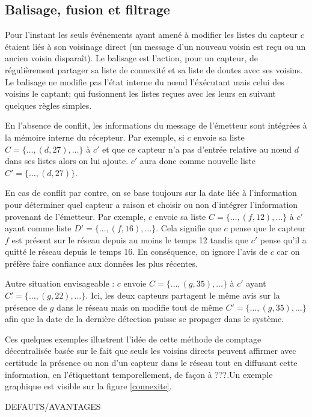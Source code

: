 \documentclass[10pt]{article}
\begin{document}
\begin{multicols}{2}
\subsection*{Balisage, fusion et filtrage}

Pour l'instant les seuls événements ayant amené à modifier les listes
du capteur $c$ étaient liés à son voisinage direct (un message d'un
nouveau voisin est reçu ou un ancien voisin disparaît). Le balisage
est l'action, pour un capteur, de régulièrement partager sa liste de
connexité et sa liste de doutes avec ses voisins. Le balisage ne
modifie pas l'état interne du n\oe ud l'éxécutant mais celui des
voisins le captant; qui fusionnent les listes reçues avec les leurs en
suivant quelques règles simples.

En l'absence de conflit, les informations du message de l'émetteur
sont intégrées à la mémoire interne du récepteur. Par exemple, si $c$
envoie sa liste $C = \{\dots,(d,27),\dots\}$ à $c'$ et que ce
capteur n'a pas d'entrée relative au n\oe ud $d$ dans ses listes alors
on lui ajoute. $c'$ aura donc comme nouvelle liste $C' =
\{\dots,(d,27)\}$.

En cas de conflit par contre, on se base toujours sur la date liée à
l'information pour déterminer quel capteur a raison et choisir ou non
d'intégrer l'information provenant de l'émetteur. Par exemple, $c$
envoie sa liste $C = \{\dots,(f,12),\dots\}$ à $c'$ ayant comme liste
$D' = \{\dots,(f,16),\dots\}$. Cela signifie que $c$ pense que le
capteur $f$ est présent sur le réseau depuis au moins le temps 12
tandis que $c'$ pense qu'il a quitté le réseau depuis le temps 16. En
conséquence, on ignore l'avis de $c$ car on préfère faire confiance
aux données les plus récentes.

Autre situation envisageable : $c$ envoie $C = \{\dots,(g,35),\dots\}$
à $c'$ ayant $C' = \{\dots,(g,22),\dots\}$. Ici, les deux capteurs
partagent le même avis sur la présence de $g$ dans le réseau mais on
modifie tout de même $C' = \{\dots,(g,35),\dots\}$ afin que la date de
la dernière détection puisse se propager dans le système.

Ces quelques exemples illustrent l'idée de cette méthode de comptage
décentralisée basée sur le fait que seuls les voisins directs peuvent
affirmer avec certitude la présence ou non d'un capteur dans le réseau
tout en diffusant cette information, en l'étiquettant temporellement,
de façon à ???.Un exemple graphique est visible sur la figure
\ref{connexite}.

DEFAUTS/AVANTAGES


\end{multicols}
\end{document}
